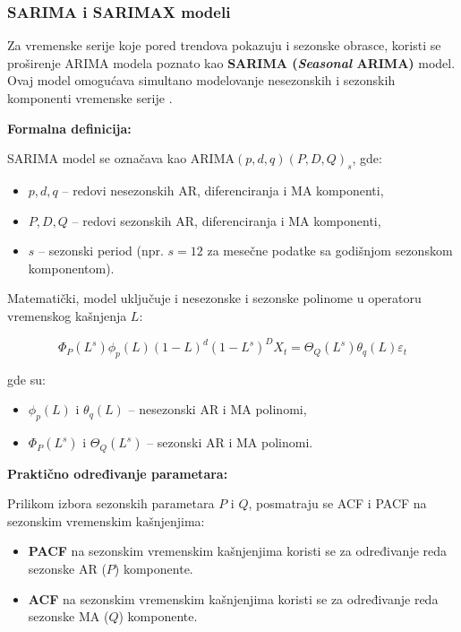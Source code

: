 \documentclass[12pt]{article}
\begin{document}
\subsubsection{SARIMA i SARIMAX modeli}

Za vremenske serije koje pored trendova pokazuju i sezonske obrasce, koristi se proširenje ARIMA modela poznato kao \textbf{SARIMA (\textit{Seasonal} ARIMA)} model. Ovaj model omogućava simultano modelovanje nesezonskih i sezonskih komponenti vremenske serije \cite{box1970, brockwell2002}.

\textbf{Formalna definicija:}

SARIMA model se označava kao ARIMA$(p,d,q)(P,D,Q)_s$, gde:

\begin{itemize}
    \item $p,d,q$ -- redovi nesezonskih AR, diferenciranja i MA komponenti,
    \item $P,D,Q$ -- redovi sezonskih AR, diferenciranja i MA komponenti,
    \item $s$ -- sezonski period (npr. $s=12$ za mesečne podatke sa godišnjom sezonskom komponentom).
\end{itemize}

Matematički, model uključuje i nesezonske i sezonske polinome u operatoru vremenskog kašnjenja $L$:

\begin{equation}
\Phi_P (L^s) \phi_p (L) (1 - L)^d (1 - L^s)^D X_t
= \Theta_Q (L^s) \theta_q (L) \varepsilon_t
\end{equation}

gde su:
\begin{itemize}
    \item $\phi_p(L)$ i $\theta_q(L)$ -- nesezonski AR i MA polinomi,
    \item $\Phi_P(L^s)$ i $\Theta_Q(L^s)$ -- sezonski AR i MA polinomi.
\end{itemize}

\textbf{Praktično određivanje parametara:}

Prilikom izbora sezonskih parametara $P$ i $Q$, posmatraju se ACF i PACF na sezonskim vremenskim kašnjenjima:

\begin{itemize}
    \item \textbf{PACF} na sezonskim vremenskim kašnjenjima koristi se za određivanje reda sezonske AR ($P$) komponente.
    \item \textbf{ACF} na sezonskim vremenskim kašnjenjima koristi se za određivanje reda sezonske MA ($Q$) komponente.
\end{itemize}
\end{document}
